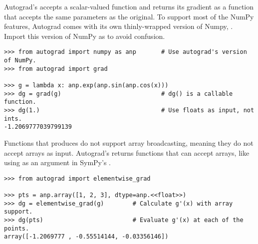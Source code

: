 Autograd's  accepts a scalar-valued function and returns its gradient as a function that accepts the same parameters as the original.
To support most of the NumPy features, Autograd comes with its own thinly-wrapped version of Numpy, .
Import this version of NumPy as  to avoid confusion.

\begin{lstlisting}
>>> from autograd import numpy as anp       # Use autograd's version of NumPy.
>>> from autograd import grad

>>> g = lambda x: anp.exp(anp.sin(anp.cos(x)))
>>> dg = grad(g)                            # dg() is a callable function.
>>> dg(1.)                                  # Use floats as input, not ints.
-1.2069777039799139
\end{lstlisting}

\begin{comment} %
Autograd can differentiate a function as many times as desired.

\begin{lstlisting}
>>> f = lambda x: anp.sin(x) + 3**anp.cos(x)

# Calculate the first derivative.
>>> df = grad(f)

# Calculate the second derivative and so forth.
>>> ddf = grad(df)
>>> dddf = grad(ddf)
>>> dddf(1.)
2.683445898750351
\end{lstlisting}
\end{comment}

Functions that  produces do not support array broadcasting, meaning they do not accept arrays as input.
Autograd's  returns functions that can accept arrays, like using  as an argument in SymPy's .

\begin{lstlisting}
>>> from autograd import elementwise_grad

>>> pts = anp.array([1, 2, 3], dtype=anp.<<float>>)
>>> dg = elementwise_grad(g)        # Calculate g'(x) with array support.
>>> dg(pts)                         # Evaluate g'(x) at each of the points.
array([-1.2069777 , -0.55514144, -0.03356146])
\end{lstlisting}



